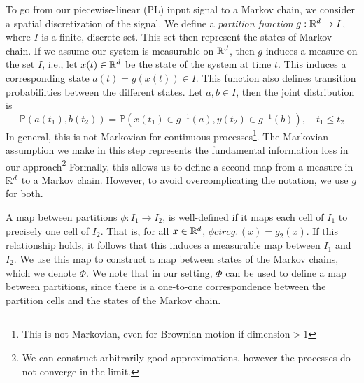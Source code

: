 To go from our piecewise-linear (PL) input signal to a Markov chain, we consider a spatial discretization of the signal.
We define a \emph{partition function} $g:\mathbb{R}^d\rightarrow I$, where $I$ is a finite, discrete set. This set then represent the states of Markov chain. If we assume our system is measurable on $\mathbb{R}^d$, then $g$ induces a measure on the set $I$, i.e., let $x(t)\in \mathbb{R}^d$ be the state of the system at time $t$. This induces a corresponding  state $a(t) = g(x(t)) \in I$. This function also defines transition probabililties between the different states. Let $a,b\in I$, then the joint distribution is
    $$\mathbb{P}(a(t_1),b(t_2)) = \mathbb{P}\left(x(t_1)\in g^{-1}(a), y(t_2) \in g^{-1}(b)\right), 	 \quad t_1\leq t_2$$
 In general, this is not Markovian for continuous processes\footnote{This is not Markovian, even for Brownian motion if dimension$>1$ }. The Markovian assumption we make in this step represents the fundamental information loss in our approach\footnote{We can construct arbitrarily good approximations, however the processes do not converge in the limit.}
Formally, this allows us to define a second map from a measure in $\mathbb{R}^d$ to a Markov chain. However, to avoid overcomplicating the notation, we use $g$ for both. 

 A map between partitions $\phi: I_1 \rightarrow I_2$, is well-defined if it maps each cell of $I_1$ to precisely one cell of $I_2$. That is, for all $x\in\mathbb{R}^d$, $\phi circ g_1(x) =  g_2(x)$. If this relationship holds, it follows that this induces a measurable map between $I_1$ and $I_2$. We use this map to construct a map between states of the Markov chains, which we denote $\Phi$.  We note that in our setting, $\Phi$ can be used to define a map between partitions, since there is a one-to-one correspondence between the partition cells and the states of the Markov chain.  


